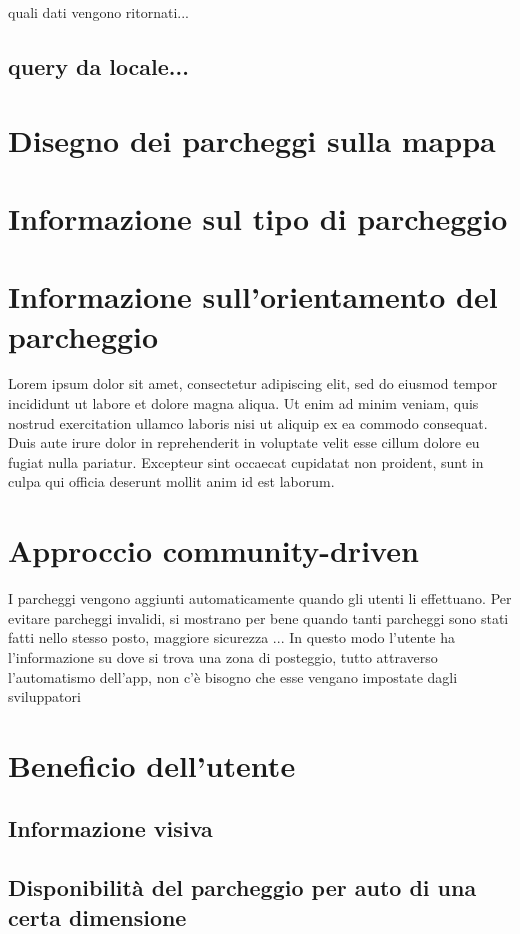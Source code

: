 quali dati vengono ritornati...



\subsection{query da locale...}

\section{Disegno dei parcheggi sulla mappa} 


\section{Informazione sul tipo di parcheggio} 


\section{Informazione sull'orientamento del parcheggio} Lorem ipsum dolor sit amet, consectetur adipiscing elit, sed do eiusmod tempor incididunt ut labore et dolore magna aliqua. Ut enim ad minim veniam, quis nostrud exercitation ullamco laboris nisi ut aliquip ex ea commodo consequat. Duis aute irure dolor in reprehenderit in voluptate velit esse cillum dolore eu fugiat nulla pariatur. Excepteur sint occaecat cupidatat non proident, sunt in culpa qui officia deserunt mollit anim id est laborum.

\section{Approccio community-driven}

I parcheggi vengono aggiunti automaticamente quando gli utenti li effettuano. 
Per evitare parcheggi invalidi, si mostrano per bene quando tanti parcheggi sono stati
fatti nello stesso posto, maggiore sicurezza ...
In questo modo l'utente ha l'informazione su dove si trova una zona di posteggio, tutto
attraverso l'automatismo dell'app, non c'è bisogno che esse vengano impostate dagli sviluppatori

\section{Beneficio dell'utente} 

\subsection{Informazione visiva}

\subsection{Disponibilità del parcheggio per auto di una certa dimensione}
